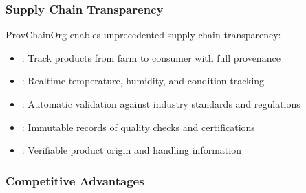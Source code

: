 \documentclass[letterpaper,10pt,english]{sphinxmanual}
\begin{document}
\subsubsection{Supply Chain Transparency}
\label{\detokenize{overview/index:supply-chain-transparency}}
\sphinxAtStartPar
ProvChainOrg enables unprecedented supply chain transparency:
\begin{itemize}
\item {} 
\sphinxAtStartPar
{}: Track products from farm to consumer with full provenance

\item {} 
\sphinxAtStartPar
{}: Real\sphinxhyphen{}time temperature, humidity, and condition tracking

\item {} 
\sphinxAtStartPar
{}: Automatic validation against industry standards and regulations

\item {} 
\sphinxAtStartPar
{}: Immutable records of quality checks and certifications

\item {} 
\sphinxAtStartPar
{}: Verifiable product origin and handling information

\end{itemize}


\subsubsection{Competitive Advantages}
\label{\detokenize{overview/index:competitive-advantages}}
\end{document}
